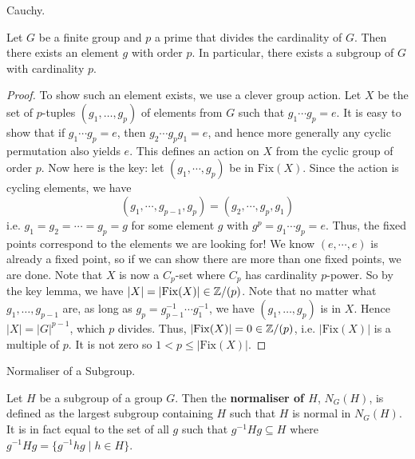 \documentclass[../../book.tex]{subfiles}
\begin{document}
\begin{thm} Cauchy.
    
    Let $G$ be a finite group and $p$ a prime that divides the cardinality of $G$.
    Then there exists an element $g$ with order $p$.
    In particular, there exists a subgroup of $G$ with cardinality $p$.
    
\end{thm}
\begin{proof}
    
    To show such an element exists, we use a clever group action. 
    Let $X$ be the set of $p$-tuples $(g_1,\dots,g_p)$ of elements from $G$ 
    such that $g_1\cdots g_p = e$. 
    It is easy to show that if $g_1 \cdots g_p = e$, then $g_2 \cdots g_p g_1 = e$,
    and hence more generally any cyclic permutation also yields $e$. 
    This defines an action on $X$ from the cyclic group of order $p$. 
    Now here is the key: let $(g_1,\cdots,g_p)$ be in $\mathrm{Fix}(X)$. 
    Since the action is cycling elements, we have \[
        (g_1,\cdots,g_{p-1},g_p) = (g_2,\cdots,g_p,g_1)
    \]
    i.e. $g_1 = g_2 = \cdots = g_p = g$ for some element $g$ 
    with $g^p = g_1\cdots g_p = e$. 
    Thus, the fixed points correspond to the elements we are looking for! 
    We know $(e,\cdots,e)$ is already a fixed point, 
    so if we can show there are more than one fixed points, we are done. 
    Note that $X$ is now a $C_p$-set where $C_p$ has cardinality $p$-power.
    So by the key lemma, we have $|X| = |\mathrm{Fix}(X)| \in \mathbb{Z} / (p)$. 
    Note that no matter what $g_1,\dots,g_{p-1}$ are, 
    as long as $g_p = g_{p-1}^{-1}\cdots g_1^{-1}$,
    we have $(g_1,\dots,g_p)$ is in $X$. 
    Hence $|X| = |G|^{p-1}$, which $p$ divides.
    Thus, $|\mathrm{Fix}(X)| = 0 \in \mathbb{Z} / (p)$, 
    i.e. $|\mathrm{Fix}(X)|$ is a multiple of $p$.
    It is not zero so $1 < p \leq |\mathrm{Fix}(X)|$. 
    
\end{proof}

\begin{dfn} Normaliser of a Subgroup. 
    
    Let $H$ be a subgroup of a group $G$. 
    Then the \textbf{normaliser of $H$}, $N_G(H)$, is defined as the largest subgroup
    containing $H$ such that $H$ is normal in $N_G(H)$. 
    It is in fact equal to the set of all $g$ such that $g^{-1}Hg \subseteq H$
    where $g^{-1} H g = \{ g^{-1}hg \mid h \in H \}$. 
    
\end{dfn}
\end{document}
